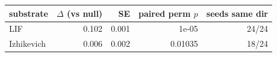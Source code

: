 \begin{tabular}{lrrrr}
\toprule
substrate & $\Delta$ (vs null) & SE & paired perm $p$ & seeds same dir \\
\midrule
LIF & 0.102 & 0.001 & 1e-05 & 24/24 \\
Izhikevich & 0.006 & 0.002 & 0.01035 & 18/24 \\
\bottomrule
\end{tabular}
